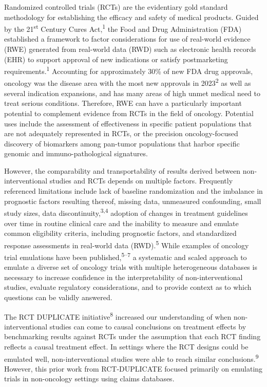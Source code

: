 \documentclass[
  letterpaper,
  DIV=11,
  numbers=noendperiod]{scrartcl}
\begin{document}
Randomized controlled trials (RCTs) are the evidentiary gold standard
methodology for establishing the efficacy and safety of medical
products. Guided by the 21\textsuperscript{st} Century Cures
Act,\textsuperscript{1} the Food and Drug Administration (FDA)
established a framework to factor considerations for use of real-world
evidence (RWE) generated from real-world data (RWD) such as electronic
health records (EHR) to support approval of new indications or satisfy
postmarketing requirements.\textsuperscript{1} Accounting for
approximately 30\% of new FDA drug approvals, oncology was the disease
area with the most new approvals in 2023\textsuperscript{2} as well as
several indication expansions, and has many areas of high unmet medical
need to treat serious conditions. Therefore, RWE can have a particularly
important potential to complement evidence from RCTs in the field of
oncology. Potential uses include the assessment of effectiveness in
specific patient populations that are not adequately represented in
RCTs, or the precision oncology-focused discovery of biomarkers among
pan-tumor populations that harbor specific genomic and
immuno-pathological signatures.

However, the comparability and transportability of results derived
between non-interventional studies and RCTs depends on multiple factors.
Frequently referenced limitations include lack of baseline randomization
and the imbalance in prognostic factors resulting thereof, missing data,
unmeasured confounding, small study sizes, data
discontinuity,\textsuperscript{3,4} adoption of changes in treatment
guidelines over time in routine clinical care and the inability to
measure and emulate common eligibility criteria, including prognostic
factors, and standardized response assessments in real-world data
(RWD).\textsuperscript{5} While examples of oncology trial emulations
have been published,\textsuperscript{5--7} a systematic and scaled
approach to emulate a diverse set of oncology trials with multiple
heterogeneous databases is necessary to increase confidence in the
interpretability of non-interventional studies, evaluate regulatory
considerations, and to provide context as to which questions can be
validly answered.

The RCT DUPLICATE initiative\textsuperscript{8} increased our
understanding of when non-interventional studies can come to causal
conclusions on treatment effects by benchmarking results against RCTs
under the assumption that each RCT finding reflects a causal treatment
effect. In settings where the RCT designs could be emulated well,
non-interventional studies were able to reach similar
conclusions.\textsuperscript{9} However, this prior work from
RCT-DUPLICATE focused primarily on emulating trials in non-oncology
settings using claims databases.
\end{document}
